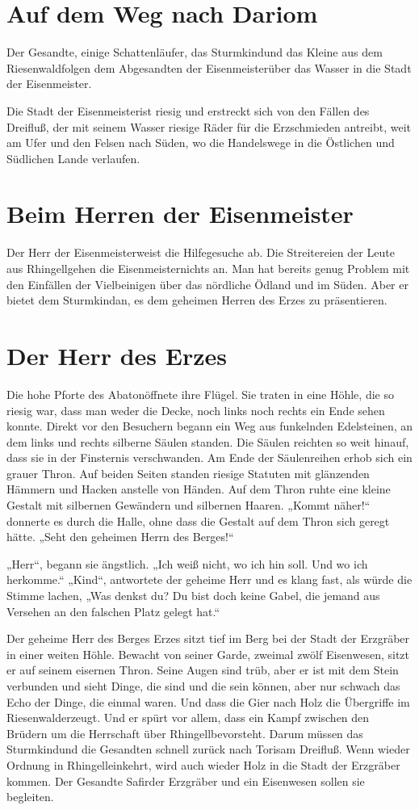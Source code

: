\documentclass[12pt,a4paper,onecolumn,twoside,ngerman]{book}
\newcommand{\Sturmkind}{Sturmkind}
\newcommand{\Schattenlaufer}{Schattenläufer}
\newcommand{\Rhingell}{Rhingell}
\newcommand{\Dreifluss}{Dreifluß}
\newcommand{\Toris}{Toris}
\newcommand{\Riesenwald}{Riesenwald}
\newcommand{\Eisenmeister}{Eisenmeister}
\newcommand{\Dariom}{Dariom}
\newcommand{\Abaton}{Abaton}
\newcommand{\Safir}{Safir}
\begin{document}
\section{Auf dem Weg nach \Dariom}
Der Gesandte, einige \Schattenlaufer, das \Sturmkind und das Kleine aus dem \Riesenwald folgen dem Abgesandten der \Eisenmeister über das Wasser in die Stadt der \Eisenmeister.

Die Stadt der \Eisenmeister ist riesig und erstreckt sich von den Fällen des \Dreifluss, der mit seinem Wasser riesige Räder für die Erzschmieden antreibt, weit am Ufer und den Felsen nach Süden, wo die Handelswege in die Östlichen und Südlichen Lande verlaufen.

\section{Beim Herren der \Eisenmeister}
Der Herr der \Eisenmeister weist die Hilfegesuche ab. Die Streitereien der Leute aus \Rhingell gehen die \Eisenmeister nichts an. Man hat bereits genug Problem mit den Einfällen der Vielbeinigen über das nördliche Ödland und im Süden. Aber er bietet dem \Sturmkind an, es dem geheimen Herren des Erzes zu präsentieren.

\section{Der Herr des Erzes}
Die hohe Pforte des \Abaton öffnete ihre Flügel. Sie traten in eine Höhle, die so riesig war, dass man weder die Decke, noch links noch rechts ein Ende sehen konnte. Direkt vor den Besuchern begann ein Weg aus funkelnden Edelsteinen, an dem links und rechts silberne Säulen standen. Die Säulen reichten so weit hinauf, dass sie in der Finsternis verschwanden.
Am Ende der Säulenreihen erhob sich ein grauer Thron. Auf beiden Seiten standen riesige Statuten mit glänzenden Hämmern und Hacken anstelle von Händen. Auf dem Thron ruhte eine kleine Gestalt mit silbernen Gewändern und silbernen Haaren. „Kommt näher!“ donnerte es durch die Halle, ohne dass die Gestalt auf dem Thron sich geregt hätte. „Seht den geheimen Herrn des Berges!“ 

„Herr“, begann sie ängstlich. „Ich weiß nicht, wo ich hin soll. Und wo ich herkomme.“
„Kind“, antwortete der geheime Herr und es klang fast, als würde die Stimme lachen, „Was denkst du? Du bist doch keine Gabel, die jemand aus Versehen an den falschen Platz gelegt hat.“

Der geheime Herr des Berges Erzes sitzt tief im Berg bei der Stadt der Erzgräber in einer weiten Höhle. Bewacht von seiner Garde, zweimal zwölf Eisenwesen, sitzt er auf seinem eisernen Thron. Seine Augen sind trüb, aber er ist mit dem Stein verbunden und sieht Dinge, die sind und die sein können, aber nur schwach das Echo der Dinge, die einmal waren. Und dass die Gier nach Holz die Übergriffe im \Riesenwald erzeugt. Und er spürt vor allem, dass ein Kampf zwischen den Brüdern um die Herrschaft über \Rhingell bevorsteht. Darum müssen das \Sturmkind und die Gesandten schnell zurück nach \Toris am \Dreifluss. Wenn wieder Ordnung in \Rhingell einkehrt, wird auch wieder Holz in die Stadt der Erzgräber kommen. Der Gesandte \Safir der Erzgräber und ein Eisenwesen sollen sie begleiten.
\end{document}
